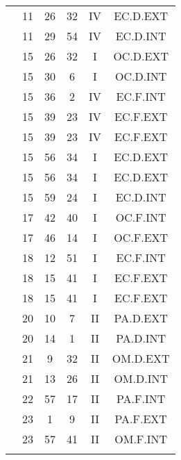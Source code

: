 \documentclass[12pt, a4paper]{article}
\begin{document}
\begin{multicols}{3}
{\begin{tabular}{c c c c c c}
	 	 	 	 & 11 & 26 & 32 & IV & EC.D.EXT\\%
	 	 	 	 & 11 & 29 & 54 & IV & EC.D.INT\\%
	 	 	 	 & 15 & 26 & 32 & I & OC.D.EXT\\%
	 	 	 	 & 15 & 30 & 6 & I & OC.D.INT\\%
	 	 	 	 & 15 & 36 & 2 & IV & EC.F.INT\\%
	 	 	 	 & 15 & 39 & 23 & IV & EC.F.EXT\\%
	 	 	 	 & 15 & 39 & 23 & IV & EC.F.EXT\\%
	 	 	 	 & 15 & 56 & 34 & I & EC.D.EXT\\%
	 	 	 	 & 15 & 56 & 34 & I & EC.D.EXT\\%
	 	 	 	 & 15 & 59 & 24 & I & EC.D.INT\\%
	 	 	 	 & 17 & 42 & 40 & I & OC.F.INT\\%
	 	 	 	 & 17 & 46 & 14 & I & OC.F.EXT\\%
	 	 	 	 & 18 & 12 & 51 & I & EC.F.INT\\%
	 	 	 	 & 18 & 15 & 41 & I & EC.F.EXT\\%
	 	 	 	 & 18 & 15 & 41 & I & EC.F.EXT\\%
	 	 	 	 & 20 & 10 & 7 & II & PA.D.EXT\\%
	 	 	 	 & 20 & 14 & 1 & II & PA.D.INT\\%
	 	 	 	 & 21 & 9 & 32 & II & OM.D.EXT\\%
	 	 	 	 & 21 & 13 & 26 & II & OM.D.INT\\%
	 	 	 	 & 22 & 57 & 17 & II & PA.F.INT\\%
	 	 	 	 & 23 & 1 & 9 & II & PA.F.EXT\\%
	 	 	 	 & 23 & 57 & 41 & II & OM.F.INT\\%
	 	 	 	 & & & & & \\%

\end{tabular}}
\end{multicols}
\end{document}

